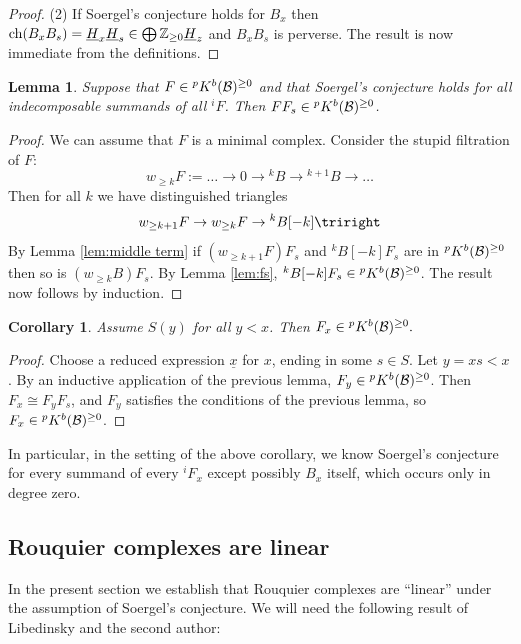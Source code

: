 \documentclass[11pt]{amsart}
\numberwithin{equation}{section}
\def\un{\underline}
\def\to{\rightarrow}
\newtheorem{lem}[thm]{Lemma}
\newtheorem{cor}[thm]{Corollary}
\theoremstyle{definition}
\theoremstyle{remark}
\begin{document}
{\begin{proof}
(2) If Soergel's conjecture holds for $B_x$ then
$\ch(B_xB_s) = \un{H}_x\un{H}_s \in \bigoplus \ZM_{\ge 0} \un{H}_z$
and $B_xB_s$ is perverse. The result is now immediate from the definitions.\end{proof}

\begin{lem} Suppose that $F \in {}^pK^b({\mathcal{B}})^{\ge 0}$ and that
  Soergel's conjecture holds for all indecomposable summands of all ${}^iF$. Then $F F_s\in {}^pK^b({\mathcal{B}})^{\ge
0}$. \end{lem}

\begin{proof} We can assume that $F$ is a minimal complex.
  Consider the stupid filtration of $F$:
\[
w_{\ge k} F := \dots \to 0 \to  {}^kB \to {}^{k+1}B \to \dots 
\]
Then for all $k$ we have distinguished triangles
\[
w_{\ge k+1}F \to w_{\ge k} F \to {}^kB[-k] \triright
\]
By Lemma \ref{lem:middle term} if $(w_{\ge k+1}F)F_s$ and ${}^kB[-k]F_s$ are in
${}^pK^b({\mathcal{B}})^{\ge 0}$ then so is $(w_{\ge k}B)F_s$. By Lemma
\ref{lem:fs}, ${}^kB[-k] F_s \in {}^pK^b({\mathcal{B}})^{\ge 0}$. The result now
follows by induction.
\end{proof}

\begin{cor} \label{lem:p>0} Assume $S(y)$ for all $y<x$. Then $F_x \in {}^pK^b({\mathcal{B}})^{\ge 0}.$ \end{cor}

\begin{proof} Choose a reduced expression $\un{x}$ for $x$, ending in some $s \in S$. Let $y = xs < x$. By an inductive application of the previous lemma, $F_y \in {}^pK^b({\mathcal{B}})^{\ge 0}$.
Then $F_x \cong F_y F_s$, and $F_y$ satisfies the conditions of the previous lemma, so $F_x \in {}^pK^b({\mathcal{B}})^{\ge 0}$. \end{proof}

In particular, in the setting of the above corollary, we know
Soergel's conjecture for every summand of every ${}^iF_x$ except possibly $B_x$
itself, which occurs only in degree zero.



\subsection{Rouquier complexes are linear}

In the present section we establish that Rouquier complexes are ``linear'' under the assumption of Soergel's conjecture. We will need the following result of Libedinsky and the second
author:

}
\end{document}
